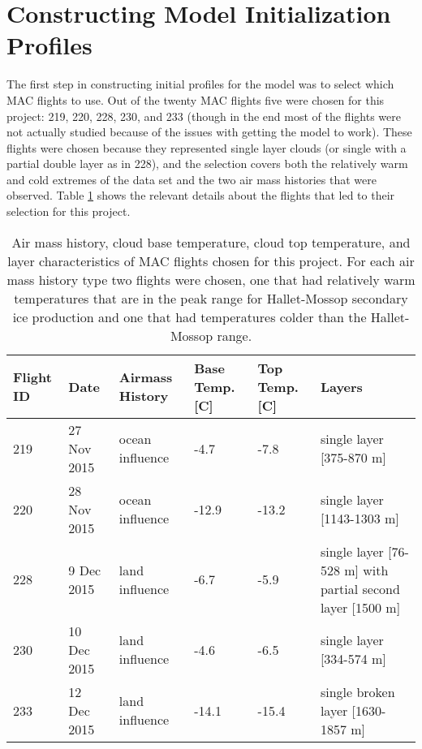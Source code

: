 \section{Constructing Model Initialization Profiles} \label{sec:profile}
The first step in constructing initial profiles for the model was to select which MAC flights to use. Out of the twenty MAC flights five were chosen for this project: 219, 220, 228, 230, and 233 (though in the end most of the flights were not actually studied because of the issues with getting the model to work). These flights were chosen because they represented single layer clouds (or single with a partial double layer as in 228), and the selection covers both the relatively warm and cold extremes of the data set and the two air mass histories that were observed. Table \ref{tab:flights} shows the relevant details about the flights that led to their selection for this project.
\newpage
\begin{table}[h]
	\centering
	\small
	\caption{Air mass history, cloud base temperature, cloud top temperature, and layer characteristics of MAC flights chosen for this project. \citep{oshea2017} For each air mass history type two flights were chosen, one that had relatively warm temperatures that are in the peak range for Hallet-Mossop secondary ice production and one that had temperatures colder than the Hallet-Mossop range.}
	\label{tab:flights}
	\begin{tabular}{|p{1.1cm}|p{2cm}|p{3.3cm}|p{1.3cm}|p{1.3cm}|p{4cm}|}
		\hline
		\textbf{Flight ID} & \textbf{Date} & \textbf{Airmass History} & \textbf{Base Temp. [C]} & \textbf{Top Temp. [C]} & \textbf{Layers}                              \\ \hline
		219                    & 27 Nov 2015   & ocean influence          & -4.7                          & -7.8                         & single layer [375-870 m]                                 \\ \hline
		220                    & 28 Nov 2015   & ocean influence          & -12.9                         & -13.2                        & single layer [1143-1303 m]                                 \\ \hline
		228                    & 9 Dec 2015    & land influence           & -6.7                          & -5.9                         & single layer [76-528 m] with partial second layer [1500 m] \\ \hline
		230                    & 10 Dec 2015   & land influence           & -4.6                          & -6.5                         & single layer [334-574 m]                                \\ \hline
		233                    & 12 Dec 2015   & land influence           & -14.1                         & -15.4                        & single broken layer [1630-1857 m]                          \\ \hline
	\end{tabular}%
\end{table}

